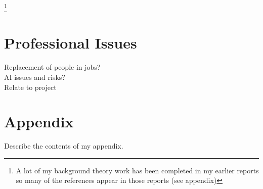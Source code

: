 \documentclass[]{final_report}
\begin{document}
\newpage
{}

\footnote{A lot of my background theory work has been completed in my earlier reports so many of the references appear in those reports (see appendix)}
\label{endpage}

\chapter{Professional Issues}
Replacement of people in jobs?\\
AI issues and risks?\\
Relate to project

\chapter{Appendix}
\label{appendix}
Describe the contents of my appendix.







\begin{figure}
	
	\caption{\label{appendix:web_app_testing}}
\end{figure}
\end{document}
